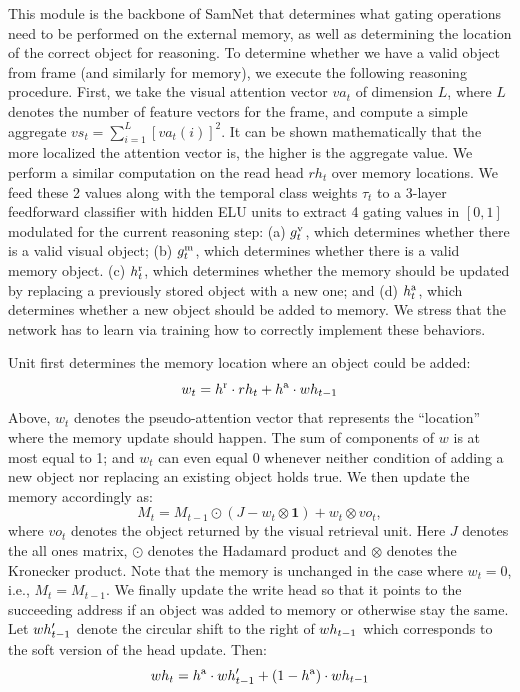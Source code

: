 This module is the backbone of SamNet that determines what gating operations need to be performed on the external memory, as well as
determining the location of the correct object for reasoning.
To determine whether we have a valid object from frame (and similarly for memory), we execute the following reasoning procedure.
First, we take the visual attention vector $va_t$ of dimension $L$, where $L$ denotes the number of feature vectors for the frame,
and compute a simple aggregate $vs_t = \sum_{i=1}^L [va_t(i)]^2$. It can be shown mathematically that the more localized the attention
vector is, the higher is the aggregate value.
We perform a similar computation on the read head $rh_t$ over memory locations.
We feed these 2 values along with the temporal class weights $\tau_t$ to a 3-layer feedforward classifier with hidden ELU units to extract 4 gating values
in $[0,1]$ modulated for the current reasoning step:
(a) $g^{\mathrm{v}}_t$, which determines whether there is a valid visual object;
(b) $g^{\mathrm{m}}_t$, which determines whether there is a valid memory object. 
(c) $h^{\mathrm{r}}_t$, which determines whether the memory should be updated by replacing a previously stored object with a new one; and
(d) $h^{\mathrm{a}}_t$, which determines whether a new object should be added to memory.
We stress that the network has to learn via training how to correctly implement these behaviors.

Unit first determines the memory location where an object could be added:
\[ w_t = h^{\mathrm{r}} \cdot rh_t + h^{\mathrm{a}} \cdot wh_{t-1} \]
Above, $w_t$ denotes the pseudo-attention vector that represents the ``location'' where the memory update should happen.
The sum of components of $w$ is at most equal to 1; and $w_t$ can even equal 0 whenever neither condition
of adding a new object nor replacing an existing object holds true.
We then update the memory accordingly as:
\[ M_t = M_{t-1} \odot (J - w_t \otimes \mathbf{1}) + w_t \otimes vo_t,\]
where $vo_t$ denotes the object returned by the visual retrieval unit. 
Here $J$ denotes the all ones matrix, $\odot$ denotes the Hadamard product and $\otimes$ denotes the Kronecker product. 
Note that the memory is unchanged in the case where $w_t = 0$, i.e., $M_t = M_{t-1}$.
We finally update the write head so that it points to the succeeding address if an object was added to memory or otherwise stay the same.
Let $wh'_{t-1}$ denote the circular shift to the right of $wh_{t-1}$ which corresponds to the soft version of the head update.
Then:
\[ wh_t = h^{\mathrm{a}} \cdot wh'_{t-1} + (1-h^{\mathrm{a}}) \cdot wh_{t-1} \]

